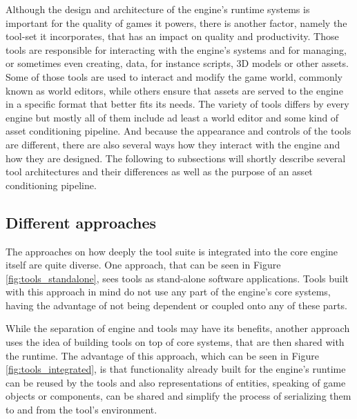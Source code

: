 Although the design and architecture of the engine's runtime systems is important for the quality of games it powers, there is another factor, namely the tool-set it incorporates, that has an impact on quality and productivity. Those tools are responsible for interacting with the engine's systems and for managing, or sometimes even creating, data, for instance scripts, 3D models or other assets. Some of those tools are used to interact and modify the game world, commonly known as world editors, while others ensure that assets are served to the engine in a specific format that better fits its needs. The variety of tools differs by every engine but mostly all of them include ad least a world editor and some kind of asset conditioning pipeline. And because the appearance and controls of the tools are different, there are also several ways how they interact with the engine and how they are designed. The following to subsections will shortly describe several tool architectures  and their differences as well as the purpose of an asset conditioning pipeline.

\subsection{Different approaches}

The approaches on how deeply the tool suite is integrated into the core engine itself are quite diverse. One approach, that can be seen in Figure \ref{fig:tools_standalone}, sees tools as stand-alone software applications. Tools built with this approach in mind do not use any part of the engine's core systems, having the advantage of not being dependent or coupled onto any of these parts. 

While the separation of engine and tools may have its benefits, another approach uses the idea of building tools on top of core systems, that are then shared with the runtime. The advantage of this approach, which can be seen in Figure \ref{fig:tools_integrated}, is that functionality already built for the engine's runtime can be reused by the tools and also representations of entities, speaking of game objects or components, can be shared and simplify the process of serializing them to and from the tool's environment.

